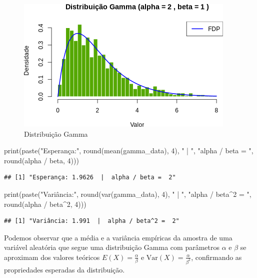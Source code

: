 \documentclass[
]{article}
\newenvironment{Shaded}{\begin{snugshade}}{\end{snugshade}}
\newcommand{\DecValTok}[1]{\textcolor[rgb]{0.00,0.00,0.81}{#1}}
\newcommand{\FunctionTok}[1]{\textcolor[rgb]{0.00,0.00,0.00}{#1}}
\newcommand{\NormalTok}[1]{#1}
\newcommand{\SpecialCharTok}[1]{\textcolor[rgb]{0.00,0.00,0.00}{#1}}
\newcommand{\StringTok}[1]{\textcolor[rgb]{0.31,0.60,0.02}{#1}}
\begin{document}
\begin{figure}

{\centering \includegraphics{7_activity_files/figure-latex/gamma-plot-1} 

}

\caption{Distribuição Gamma}\label{fig:gamma-plot}
\end{figure}

\begin{Shaded}
\begin{Highlighting}[]
\FunctionTok{print}\NormalTok{(}\FunctionTok{paste}\NormalTok{(}\StringTok{"Esperança:"}\NormalTok{, }\FunctionTok{round}\NormalTok{(}\FunctionTok{mean}\NormalTok{(gamma\_data), }\DecValTok{4}\NormalTok{), }\StringTok{" | "}\NormalTok{, }\StringTok{"alpha / beta = "}\NormalTok{, }\FunctionTok{round}\NormalTok{(alpha }\SpecialCharTok{/}\NormalTok{ beta, }\DecValTok{4}\NormalTok{)))}
\end{Highlighting}
\end{Shaded}

\begin{verbatim}
## [1] "Esperança: 1.9626  |  alpha / beta =  2"
\end{verbatim}

\begin{Shaded}
\begin{Highlighting}[]
\FunctionTok{print}\NormalTok{(}\FunctionTok{paste}\NormalTok{(}\StringTok{"Variância:"}\NormalTok{, }\FunctionTok{round}\NormalTok{(}\FunctionTok{var}\NormalTok{(gamma\_data), }\DecValTok{4}\NormalTok{), }\StringTok{" | "}\NormalTok{, }\StringTok{"alpha / beta\^{}2 = "}\NormalTok{, }\FunctionTok{round}\NormalTok{(alpha }\SpecialCharTok{/}\NormalTok{ beta}\SpecialCharTok{\^{}}\DecValTok{2}\NormalTok{, }\DecValTok{4}\NormalTok{)))}
\end{Highlighting}
\end{Shaded}

\begin{verbatim}
## [1] "Variância: 1.991  |  alpha / beta^2 =  2"
\end{verbatim}

Podemos observar que a média e a variância empíricas da amostra de uma variável aleatória que segue uma distribuição Gamma com parâmetros \(\alpha\) e \(\beta\) se aproximam dos valores teóricos \(E(X) = \frac{\alpha}{\beta}\) e \(\text{Var}(X) = \frac{\alpha}{\beta^2}\), confirmando as propriedades esperadas da distribuição.
\end{document}
